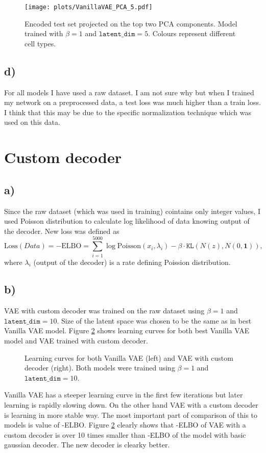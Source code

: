 \documentclass[a4paper,11pt]{article}
\begin{document}
\begin{figure}[H]
    \centering
    \texttt{[image: plots/VanillaVAE\_PCA\_5.pdf]}
    \caption{Encoded test set projected on the top two PCA components. Model trained with $\beta=1$ and $\texttt{latent\_dim}=5$. Colours represent different cell types. }
    \label{PCA4}
\end{figure}

\subsection*{d)}
For all models I have used a raw dataset. I am not sure why but when I trained my network on a preprocessed data, a test loss was much higher than a train loss. I think that this may be due to the specific normalization technique which was used on this data.

\section{Custom decoder}

\subsection*{a)}
Since the raw dataset (which was used in training) cointains only integer values, I used Poisson distribution to calculate log likelihood of data knowing output of the decoder. New loss was defined as
\begin{equation}
    \text{Loss}(Data) = -\text{ELBO} = \sum_{i = 1}^{5000} \log{\text{Poisson}(x_i, \lambda_i)}-\beta \cdot \texttt{KL}(N(z), N(0, \mathbf{1})),
\end{equation}
where $\lambda_i$ (output of the decoder) is a rate defining Poission distribution.
\subsection*{b)}
VAE with custom decoder was trained on the raw dataset using $\beta=1$ and $\texttt{latent\_dim}=10$. Size of the latent space was chosen to be the same as in best Vanilla VAE model. Figure \ref{VAE:comp} shows learning curves for both best Vanilla VAE model and VAE trained with custom decoder.
\begin{figure}[H]
    \centering
    \qquad
    \caption{Learning curves for both Vanilla VAE (left) and VAE with custom decoder (right). Both models were trained using $\beta=1$ and $\texttt{latent\_dim}=10$.}%
    \label{VAE:comp}
\end{figure}
\noindent Vanilla VAE has a steeper learning curve in the first few iterations but later learning is rapidly slowing down. On the other hand VAE with a custom decoder is learning in more stable way. The most important part of comparison of this to models is value of -ELBO. Figure \ref{VAE:comp} clearly shows that -ELBO of VAE with a custom decoder is over 10 times smaller than -ELBO of the model with basic gaussian decoder. The new decoder is clearky better. 
\end{document}
